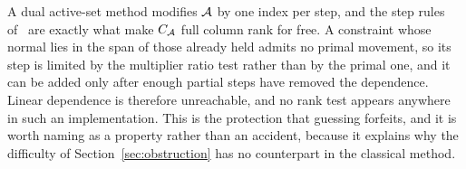 \begin{remark}\label{rem:walk}
A dual active-set method modifies $\mathcal{A}$ by one index per step, and the step
rules of~\cite{goldfarb1983} are exactly what make $C_{\mathcal{A}}$ full column rank
for free. A constraint whose normal lies in the span of those already held admits
no primal movement, so its step is limited by the multiplier ratio test rather
than by the primal one, and it can be added only after enough partial steps have
removed the dependence. Linear dependence is therefore unreachable, and no rank
test appears anywhere in such an implementation. This is the protection that
guessing forfeits, and it is worth naming as a property rather than an accident,
because it explains why the difficulty of Section~\ref{sec:obstruction} has no
counterpart in the classical method.
\end{remark}
